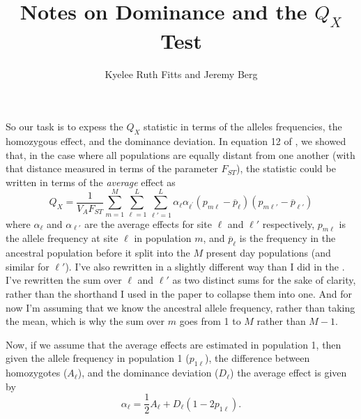 \documentclass[a4paper,10pt]{article}
\begin{document}
\title{Notes on Dominance and the $Q_X$ Test}

\author{
  Kyelee Ruth Fitts and Jeremy Berg
}

\date{}

\maketitle

So our task is to expess the $Q_X$ statistic in terms of the alleles frequencies, the homozygous effect, and the dominance deviation. In equation 12 of \cite{Berg:2014bs}, we showed that, in the case where all populations are equally distant from one another (with that distance measured in terms of the parameter $F_{ST}$), the statistic could be written in terms of the \textit{average} effect as
\begin{equation} \label{eqn:Qxraw}
  Q_X = \frac{1}{V_A F_{ST}} \sum_{m=1}^M \sum_{\ell=1}^L \sum_{\ell\prime=1}^L \alpha_{\ell} \alpha_{\ell^{\prime}}\left(p_{m\ell} - \overline{p}_\ell \right)\left(p_{m \ell\prime} - \overline{p}_{\ell\prime}\right)
\end{equation}
where $\alpha_\ell$ and $\alpha_{\ell\prime}$ are the average effects for site $\ell$ and $\ell\prime$ respectively, $p_{m\ell}$ is the allele frequency at site $\ell$ in population $m$, and $\overline{p}_\ell$ is the frequency in the ancestral population before it split into the $M$ present day populations (and similar for $\ell\prime$). I've also rewritten in a slightly different way than I did in the \cite{Berg:2014bs}. I've rewritten the sum over $\ell$ and $\ell\prime$ as two distinct sums for the sake of clarity, rather than the shorthand I used in the paper to collapse them into one. And for now I'm assuming that we know the ancestral allele frequency, rather than taking the mean, which is why the sum over $m$ goes from 1 to $M$ rather than $M-1$.

Now, if we assume that the average effects are estimated in population 1, then given the allele frequency in population 1 ($p_{1\ell}$), the difference between homozygotes ($A_\ell$), and the dominance deviation ($D_\ell$) the average effect is given by
\begin{equation}  \label{eqn:avgeff}
  \alpha_\ell = \frac{1}{2} A_\ell + D_\ell\left(1-2p_{1\ell}\right).
\end{equation}
\end{document}
